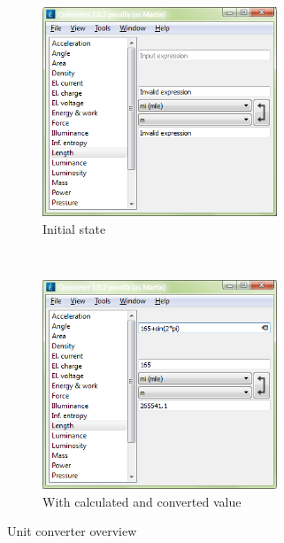 \begin{figure}[ht]
\centering
\begin{subfigure}[b]{0.48\textwidth}
\centering
\includegraphics[width=7cm]{graphics/real-world/03-unit}
\caption{Initial state}
\end{subfigure}
~
\begin{subfigure}[b]{0.48\textwidth}
\centering
\includegraphics[width=7cm]{graphics/real-world/03-unit-full}
\caption{With calculated and converted value}
\end{subfigure}
\caption{Unit converter overview}\label{figure:unit}
\end{figure}